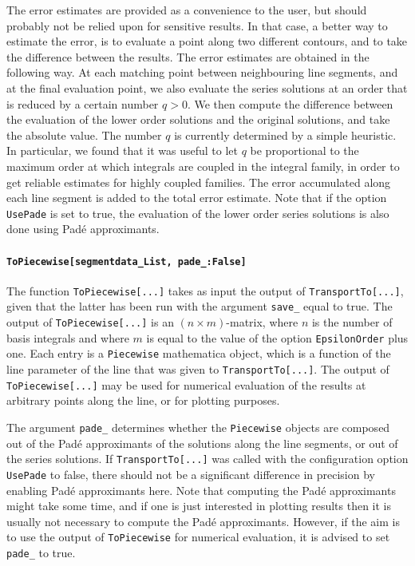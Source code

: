 \documentclass{article}
\begin{document}
The error estimates are provided as a convenience to the user, but should probably not be relied upon for sensitive results. In that case, a better way to estimate the error, is to evaluate a point along two different contours, and to take the difference between the results. The error estimates are obtained in the following way. At each matching point between neighbouring line segments, and at the final evaluation point, we also evaluate the series solutions at an order that is reduced by a certain number $q > 0$. We then compute the difference between the evaluation of the lower order solutions and the original solutions, and take the absolute value. The number $q$ is currently determined by a simple heuristic. In particular, we found that it was useful to let $q$ be proportional to the maximum order at which integrals are coupled in the integral family, in order to get reliable estimates for highly coupled families. The error accumulated along each line segment is added to the total error estimate. Note that if the option \texttt{UsePade} is set to true, the evaluation of the lower order series solutions is also done using Padé approximants.

\paragraph{\texttt{ToPiecewise[segmentdata_List, pade_:False]}}
The function \texttt{ToPiecewise[...]} takes as input the output of \texttt{TransportTo[...]}, given that the latter has been run with the argument \texttt{save\_} equal to true. The output of \texttt{ToPiecewise[...]} is an $(n\times m)$-matrix, where $n$ is the number of basis integrals and where $m$ is equal to the value of the option \texttt{EpsilonOrder} plus one. Each entry is a \texttt{Piecewise} mathematica object, which is a function of the line parameter of the line that was given to \texttt{TransportTo[...]}. The output of \texttt{ToPiecewise[...]} may be used for numerical evaluation of the results at arbitrary points along the line, or for plotting purposes.

The argument \texttt{pade\_} determines whether the \texttt{Piecewise} objects are composed out of the Padé approximants of the solutions along the line segments, or out of the series solutions. If \texttt{TransportTo[...]} was called with the configuration option \texttt{UsePade} to false, there should not be a significant difference in precision by enabling Padé approximants here. Note that computing the Padé approximants might take some time, and if one is just interested in plotting results then it is usually not necessary to compute the Padé approximants. However, if the aim is to use the output of \texttt{ToPiecewise} for numerical evaluation, it is advised to set \texttt{pade\_} to true.
\end{document}
